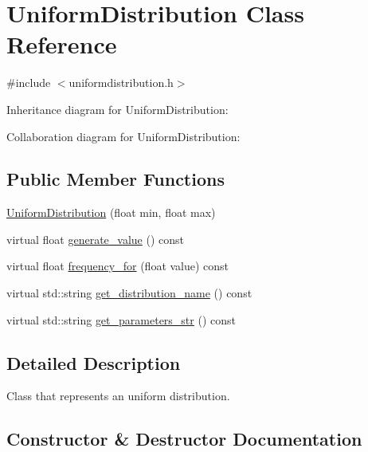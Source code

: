 \hypertarget{classUniformDistribution}{}\section{Uniform\+Distribution Class Reference}
\label{classUniformDistribution}


{\ttfamily \#include $<$uniformdistribution.\+h$>$}



Inheritance diagram for Uniform\+Distribution\+:


Collaboration diagram for Uniform\+Distribution\+:
\subsection*{Public Member Functions}
\begin{DoxyCompactItemize}
\item 
\hyperlink{classUniformDistribution_ab9fbcd64819f53f1bb56a0f49562f529}{Uniform\+Distribution} (float min, float max)
\item 
virtual float \hyperlink{classUniformDistribution_ab2bfddd4540b6f88d1d366c9d1bbb5e6}{generate\+\_\+value} () const
\item 
virtual float \hyperlink{classUniformDistribution_a3e96960abeab2f77b22c3a2b9c80695b}{frequency\+\_\+for} (float value) const
\item 
virtual std\+::string \hyperlink{classUniformDistribution_a41a9a47839d15e67d5e2432f983ed382}{get\+\_\+distribution\+\_\+name} () const
\item 
virtual std\+::string \hyperlink{classUniformDistribution_a9e276cfa4ff3021a0e4b1b4edd8a1c67}{get\+\_\+parameters\+\_\+str} () const
\end{DoxyCompactItemize}


\subsection{Detailed Description}
Class that represents an uniform distribution. 

\subsection{Constructor \& Destructor Documentation}
\mbox{\label{classUniformDistribution_ab9fbcd64819f53f1bb56a0f49562f529}} 
